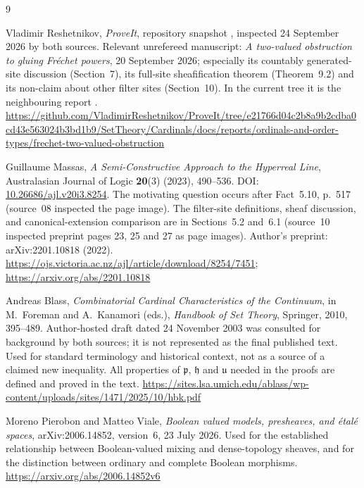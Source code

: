 \documentclass[11pt,letterpaper]{article}
\theoremstyle{definition}
\theoremstyle{remark}
\newcommand{\cp}{\mathfrak p}
\newcommand{\cu}{\mathfrak u}
\newcommand{\ch}{\mathfrak h}
\begin{document}
\begin{thebibliography}{9}

Vladimir Reshetnikov, \emph{ProveIt}, repository snapshot
, inspected
24 September 2026 by both sources. Relevant unrefereed manuscript:
\emph{A two-valued obstruction to gluing Fr\'echet powers},
20 September 2026; especially its countably generated-site discussion
(Section~7), its full-site sheafification theorem (Theorem~9.2) and its
non-claim about other filter sites (Section~10). In the current tree it
is the neighbouring report
.
\newblock\url{https://github.com/VladimirReshetnikov/ProveIt/tree/e21766d04c2b8a9b2cdba0cd43e563024b3bd1b9/SetTheory/Cardinals/docs/reports/ordinals-and-order-types/frechet-two-valued-obstruction}

Guillaume Massas, \emph{A Semi-Constructive Approach to the Hyperreal
Line}, Australasian Journal of Logic \textbf{20}(3) (2023), 490--536.
\newblock DOI: \href{https://doi.org/10.26686/ajl.v20i3.8254}{10.26686/ajl.v20i3.8254}.
The motivating question occurs after Fact~5.10, p.~517 (source~08
inspected the page image). The filter-site definitions, sheaf
discussion, and canonical-extension comparison are in Sections~5.2
and~6.1 (source~10 inspected preprint pages 23, 25 and 27 as page
images). Author's preprint: arXiv:2201.10818 (2022).
\newblock\url{https://ojs.victoria.ac.nz/ajl/article/download/8254/7451};
\url{https://arxiv.org/abs/2201.10818}

Andreas Blass, \emph{Combinatorial Cardinal Characteristics of the
Continuum}, in M.~Foreman and A.~Kanamori (eds.),
\emph{Handbook of Set Theory}, Springer, 2010, 395--489.
Author-hosted draft dated 24 November 2003 was consulted for
background by both sources; it is not represented as the final published
text. Used for standard terminology and historical context, not as a
source of a claimed new inequality. All properties of $\cp$, $\ch$ and
$\cu$ needed in the proofs are defined and proved in the text.
\newblock\url{https://sites.lsa.umich.edu/ablass/wp-content/uploads/sites/1471/2025/10/hbk.pdf}

Moreno Pierobon and Matteo Viale, \emph{Boolean valued models,
presheaves, and \'etal\'e spaces}, arXiv:2006.14852,
version~6, 23 July 2026. Used for the established relationship
between Boolean-valued mixing and dense-topology sheaves, and for
the distinction between ordinary and complete Boolean morphisms.
\newblock\url{https://arxiv.org/abs/2006.14852v6}


\end{thebibliography}
\end{document}
